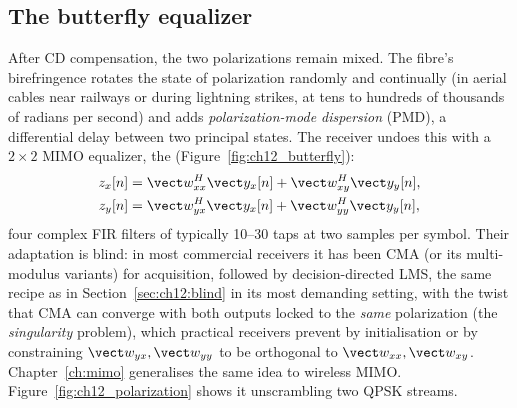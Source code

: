 \subsection{The butterfly equalizer}

After CD compensation, the two polarizations remain mixed. The fibre's birefringence rotates the
state of polarization randomly and continually (in aerial cables near railways or during lightning
strikes, at tens to hundreds of thousands of radians per second) and adds \emph{polarization-mode
dispersion} (PMD), a differential delay between two principal states. The receiver undoes this with a
$2\times2$ MIMO equalizer, the  (Figure~\ref{fig:ch12_butterfly}):
\begin{equation}
\begin{aligned}
z_x[n]&=\vect w_{xx}^H\vect y_x[n]+\vect w_{xy}^H\vect y_y[n],\\
z_y[n]&=\vect w_{yx}^H\vect y_x[n]+\vect w_{yy}^H\vect y_y[n],
\end{aligned}
\end{equation}
four complex FIR filters of typically 10--30 taps at two samples per symbol. Their adaptation is blind:
in most commercial receivers it has been CMA (or its multi-modulus variants) for acquisition,
followed by decision-directed LMS, the same recipe as in Section~\ref{sec:ch12:blind} in its most
demanding setting, with the twist that CMA can converge with both outputs locked to the \emph{same}
polarization (the \emph{singularity} problem), which practical receivers prevent by initialisation
or by constraining $\vect w_{yx}, \vect w_{yy}$ to be orthogonal to $\vect w_{xx}, \vect w_{xy}$.
Chapter~\ref{ch:mimo} generalises the same idea to wireless MIMO. Figure~\ref{fig:ch12_polarization}
shows it unscrambling two QPSK streams.

